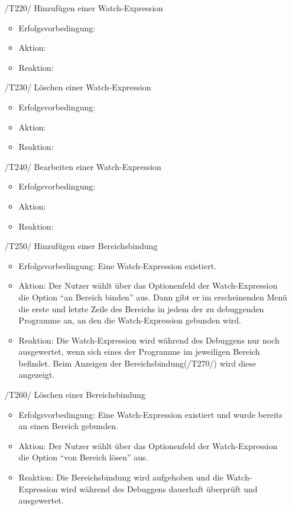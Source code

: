 \documentclass[parskip=full]{scrartcl}
\begin{document}
\begin{itemize}

	\item[/T220/] Hinzufügen einer \gls{Watch-Expression}
		\begin{itemize}
		\item Erfolgsvorbedingung:
		\item Aktion:
		\item Reaktion:		
		\end{itemize}	
	
	\item[/T230/] Löschen einer Watch-Expression
		\begin{itemize}
		\item Erfolgsvorbedingung:
		\item Aktion:
		\item Reaktion:		
		\end{itemize}	
	
	\item[/T240/] Bearbeiten einer Watch-Expression
		\begin{itemize}
		\item Erfolgsvorbedingung:
		\item Aktion:
		\item Reaktion:		
		\end{itemize}	
	
	\item[/T250/] Hinzufügen einer Bereichsbindung
		\begin{itemize}
		\item Erfolgsvorbedingung: Eine Watch-Expression existiert.
		\item Aktion: Der Nutzer wählt über das Optionenfeld der Watch-Expression die Option \enquote{an Bereich binden} aus. Dann gibt er im erscheinenden Menü die erste und letzte Zeile des Bereichs in jedem der zu debuggenden Programme an, an den die Watch-Expression gebunden wird. 
		\item Reaktion:	Die Watch-Expression wird während des Debuggens nur noch ausgewertet, wenn sich eines der Programme im jeweiligen Bereich befindet. Beim Anzeigen der Bereichsbindung(/T270/) wird diese angezeigt. 
		\end{itemize}	
	
	\item[/T260/] Löschen einer Bereichsbindung
		\begin{itemize}
		\item Erfolgsvorbedingung: Eine Watch-Expression existiert und wurde bereits an einen Bereich gebunden. 
		\item Aktion: Der Nutzer wählt über das Optionenfeld der Watch-Expression die Option \enquote{von Bereich lösen} aus.
		\item Reaktion:	Die Bereichsbindung wird aufgehoben und die Watch-Expression wird während des Debuggens dauerhaft überprüft und ausgewertet.
		\end{itemize}	
	

\end{itemize}
\end{document}

